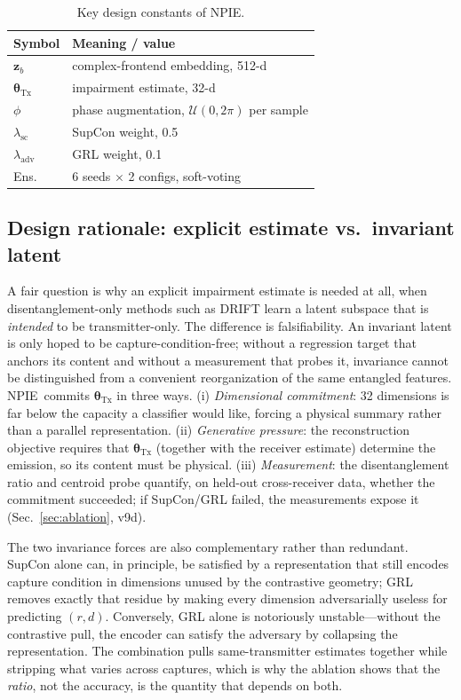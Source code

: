 \documentclass[journal]{IEEEtran}
\newcommand{\npie}{\textsc{NPIE}}
\newcommand{\tx}{\boldsymbol{\theta}_{\mathrm{Tx}}}
\begin{document}
\begin{table}[t]
\centering
\footnotesize
\caption{Key design constants of \npie.}
\label{tab:hparam}
\begin{tabular}{@{}ll@{}}
\toprule
Symbol & Meaning / value \\
\midrule
$\mathbf{z}_b$ & complex-frontend embedding, 512-d \\
$\tx$ & impairment estimate, 32-d \\
$\phi$ & phase augmentation, $\mathcal{U}(0,2\pi)$ per sample \\
$\lambda_{\mathrm{sc}}$ & SupCon weight, 0.5 \\
$\lambda_{\mathrm{adv}}$ & GRL weight, 0.1 \\
Ens. & 6 seeds $\times$ 2 configs, soft-voting \\
\bottomrule
\end{tabular}
\end{table}

\subsection{Design rationale: explicit estimate vs.\ invariant latent}
\label{sec:rationale}
A fair question is why an explicit impairment estimate is needed at all, when disentanglement-only methods such as DRIFT learn a latent subspace that is \emph{intended} to be transmitter-only. The difference is falsifiability. An invariant latent is only hoped to be capture-condition-free; without a regression target that anchors its content and without a measurement that probes it, invariance cannot be distinguished from a convenient reorganization of the same entangled features. \npie\ commits $\tx$ in three ways. (i) \emph{Dimensional commitment}: 32 dimensions is far below the capacity a classifier would like, forcing a physical summary rather than a parallel representation. (ii) \emph{Generative pressure}: the reconstruction objective requires that $\tx$ (together with the receiver estimate) determine the emission, so its content must be physical. (iii) \emph{Measurement}: the disentanglement ratio and centroid probe quantify, on held-out cross-receiver data, whether the commitment succeeded; if SupCon/GRL failed, the measurements expose it (Sec.~\ref{sec:ablation}, v9d).

The two invariance forces are also complementary rather than redundant. SupCon alone can, in principle, be satisfied by a representation that still encodes capture condition in dimensions unused by the contrastive geometry; GRL removes exactly that residue by making every dimension adversarially useless for predicting $(r,d)$. Conversely, GRL alone is notoriously unstable---without the contrastive pull, the encoder can satisfy the adversary by collapsing the representation. The combination pulls same-transmitter estimates together while stripping what varies across captures, which is why the ablation shows that the \emph{ratio}, not the accuracy, is the quantity that depends on both.
\end{document}
